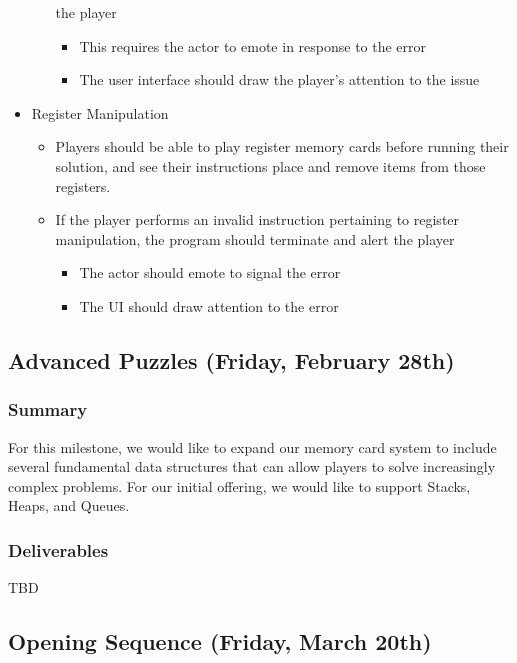 \begin{itemize}
\begin{itemize}
    the player
    \begin{itemize}
      \item This requires the actor to emote in response to the error
      \item The user interface should draw the player’s attention to the issue
    \end{itemize}
  \end{itemize}
  \item Register Manipulation
  \begin{itemize}
    \item Players should be able to play register memory cards before running
    their solution, and see their instructions place and remove items from those
    registers.
    \item If the player performs an invalid instruction pertaining to register
    manipulation, the program should terminate and alert the player
    \begin{itemize}
      \item The actor should emote to signal the error
      \item The UI should draw attention to the error
    \end{itemize}
  \end{itemize}
\end{itemize}


\subsection{Advanced Puzzles (Friday, February 28th)}

\subsubsection*{Summary}
For this milestone, we would like to expand our memory card system to include
several fundamental data structures that can allow players to solve increasingly
complex problems. For our initial offering, we would like to support Stacks,
Heaps, and Queues.

\subsubsection*{Deliverables}
TBD

\subsection{Opening Sequence (Friday, March 20th)}

